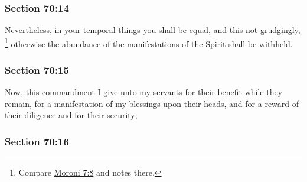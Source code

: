 
	\subsubsection{Section 70:14} %
		\label{DC70-14}

		Nevertheless, in your temporal things you shall be equal, and this not grudgingly,%
			\footnote{%
				Compare \hyperref[MORONI-7-8]{Moroni 7:8} and notes there.
				} 
		otherwise the abundance of the manifestations of the Spirit shall be withheld.


	\subsubsection{Section 70:15} %
		\label{DC70-15}

		Now, this commandment I give unto my servants for their benefit while they remain, for a manifestation of my blessings upon their heads, and for a reward of their diligence and for their security;


	\subsubsection{Section 70:16} %
		\label{DC70-16}

